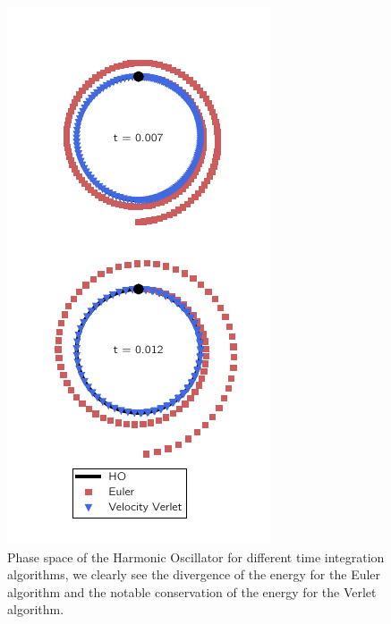 \documentclass[ansiapaper]{report}
\begin{document}
\begin{multicols}{3}
  \begin{figure}[H]
    \centering
    \includegraphics[width=1\linewidth]{./figures/HarmonicOscillator.pdf}
    \caption{\label{fig:sample} Phase space of the Harmonic Oscillator for different time integration algorithms, we clearly see the divergence of the energy for the Euler algorithm and the notable conservation of the energy for the Verlet algorithm.}
  \end{figure}

\end{multicols}
\end{document}
